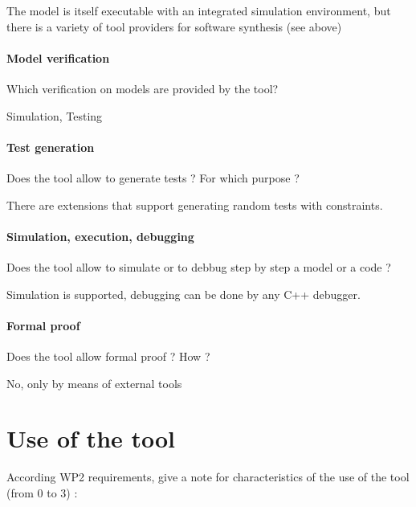 The model is itself executable with an integrated simulation environment, but there is a variety of tool providers for software synthesis (see above)

\paragraph{Model verification}
Which verification on models are provided by the tool?

Simulation, Testing

\paragraph{Test generation}
Does the tool allow to generate tests ? For  which purpose ?

There are extensions that support generating random tests with constraints.

\paragraph{Simulation, execution, debugging}
Does the tool allow to simulate or to debbug step by step a model or a code ?

Simulation is supported, debugging can be done by any C++ debugger.

\paragraph{Formal proof}
Does the tool allow formal proof ?  How ?

No, only by means of external tools


\section{Use of the tool}


According WP2 requirements, give a note for characteristics of the use of the tool (from 0 to 3) :

